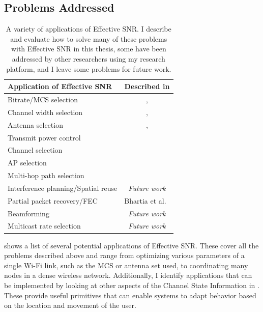 
\subsection{Problems Addressed}
\begin{table}[htp]
	\centering
	\begin{tabular}{lc}
	\toprule
		Application of Effective SNR & Described in \\
	\midrule
		Bitrate/MCS selection & \chapref{chap:delivery}, \chapref{chap:rate}\\
		Channel width selection & \chapref{chap:delivery}, \chapref{chap:rate}\\
		Antenna selection & \chapref{chap:delivery}, \chapref{chap:rate}\\
		Transmit power control & \chapref{chap:delivery}\\
		Channel selection & \chapref{chap:applications}\\
		AP selection & \chapref{chap:applications}\\
		Multi-hop path selection & \chapref{chap:applications}\\
		Interference planning/Spatial reuse & \emph{Future work}\\
		Partial packet recovery/FEC & Bhartia et al.~\cite{Bhartia_FreqDiv}\\
		Beamforming & \emph{Future work}\\
		Multicast rate selection & \emph{Future work}\\
	\bottomrule
	\end{tabular}
	\caption[A variety of applications of Effective SNR]{\label{tab:esnr_uses}A variety of applications of Effective SNR. I describe and evaluate how to solve many of these problems with Effective SNR in this thesis, some have been addressed by other researchers using my research platform, and I leave some problems for future work.}
\end{table}

 shows a list of several potential applications of Effective SNR. These cover all the problems described above and range from optimizing various parameters of a single Wi-Fi link, such as the MCS or antenna set used, to coordinating many nodes in a dense wireless network. Additionally, I identify applications that can be implemented by looking at other aspects of the Channel State Information in . These provide useful primitives that can enable systems to adapt behavior based on the location and movement of the user.


